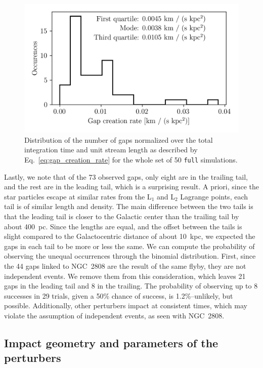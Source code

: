         \begin{figure}
            \centering
            \includegraphics[width=\linewidth]{images/gap_creation_rate.png}
            \caption{Distribution of the number of gaps normalized over the total integration time and unit stream length as described by Eq.~\ref{eq:gap_creation_rate} for the whole set of 50 \texttt{full} simulations. }
            \label{fig:gapcreationrate}
        \end{figure}

        Lastly, we note that of the 73 observed gaps, only eight are in the trailing tail, and the rest are in the leading tail, which is a surprising result. A priori, since the star particles escape at similar rates from the L$_1$ and L$_2$ Lagrange points, each tail is of similar length and density. The main difference between the two tails is that the leading tail is closer to the Galactic center than the trailing tail by about 400~pc. Since the lengths are equal, and the offset between the tails is slight compared to the Galactocentric distance of about 10~kpc, we expected the gaps in each tail to be more or less the same. We can compute the probability of observing the unequal occurrences through the binomial distribution. First, since the 44 gaps linked to NGC~2808 are the result of the same flyby, they are not independent events. We remove them from this consideration, which leaves 21 gaps in the leading tail and 8 in the trailing. The probability of observing up to 8 successes in 29 trials, given a 50\% chance of success, is 1.2\%--unlikely, but possible. Additionally, other perturbers impact at consistent times, which may violate the assumption of independent events, as seen with NGC~2808.

    \subsection{Impact geometry and parameters of the perturbers}\label{sect:geometry}

